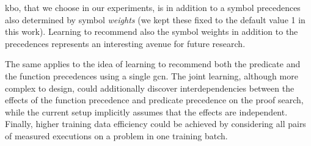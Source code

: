 \documentclass[runningheads]{llncs}
\begin{document}
\gls{kbo}, that we choose in our experiments, is in addition to a symbol precedences
also determined by symbol \emph{weights} (we kept these fixed to the default value 1 in this work).
Learning to recommend also the symbol weights in addition to the precedences
represents an interesting avenue for future research.

The same applies to the idea of learning to recommend 
both the predicate and the function precedences using a single \gls{gcn}.
The joint learning, although more complex to design, could 
additionally discover interdependencies
between the effects of the function precedence and predicate precedence on the proof search,
while the current setup implicitly assumes that the effects are independent.
Finally, higher training data efficiency could be achieved by considering all pairs of measured executions on a problem
in one training batch.

\end{document}
